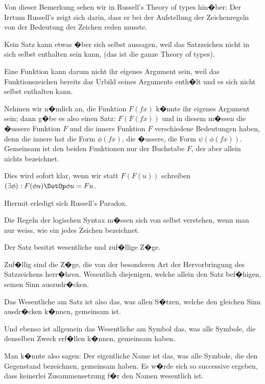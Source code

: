 \begin{propositions}
{Von dieser Bemerkung sehen wir in Russell's
\glqq{}Theory of types\grqq{} hin�ber: Der Irrtum Russell's
zeigt sich darin, dass er bei der Aufstellung der
Zeichenregeln von der Bedeutung der Zeichen
reden musste.}


{Kein Satz kann etwas �ber sich selbst aussagen,
weil das Satzzeichen nicht in sich selbst enthalten
sein kann, (das ist die ganze \glqq{}Theory of types\grqq{}).}


{Eine Funktion kann darum nicht ihr eigenes
Argument sein, weil das Funktionszeichen bereits
das Urbild seines Arguments enth�lt und es sich
nicht selbst enthalten kann.

Nehmen wir n�mlich an, die Funktion $F (fx)$
k�nnte ihr eigenes Argument sein; dann g�be es
also einen Satz: \glqq{}$F(F(fx))$\grqq{} und in diesem m�ssen
die �ussere Funktion $F$ und die innere Funktion $F$
verschiedene Bedeutungen haben, denn die innere
hat die Form $\phi(fx)$, die �ussere, die Form $\psi(\phi(fx))$.
Gemeinsam ist den beiden Funktionen nur der
Buchstabe \glqq{}$F$\grqq{}, der aber allein nichts bezeichnet.

Dies wird sofort klar, wenn wir statt \glqq{}$F(F(u))$\grqq{}
schreiben \glqq{}$(\exists\phi) : F(\phi u) \DotOp \phi u = Fu$\grqq{}.

Hiermit erledigt sich Russell's Paradox.}


{Die Regeln der logischen Syntax m�ssen sich
von selbst verstehen, wenn man nur weiss, wie
ein jedes Zeichen bezeichnet.}


{Der Satz besitzt wesentliche und zuf�llige Z�ge.

Zuf�llig sind die Z�ge, die von der besonderen
Art der Hervorbringung des Satzzeichens herr�hren.
Wesentlich diejenigen, welche allein den Satz bef�higen,
seinen Sinn auszudr�cken.}


{Das Wesentliche am Satz ist also das, was allen
S�tzen, welche den gleichen Sinn ausdr�cken
k�nnen, gemeinsam ist.

Und ebenso ist allgemein das Wesentliche am
Symbol das, was alle Symbole, die denselben
Zweck erf�llen k�nnen, gemeinsam haben.}


{Man k�nnte also sagen: Der eigentliche Name
ist das, was alle Symbole, die den Gegenstand
bezeichnen, gemeinsam haben. Es w�rde sich so
successive ergeben, dass keinerlei Zusammensetzung
f�r den Namen wesentlich ist.}



\end{propositions}

